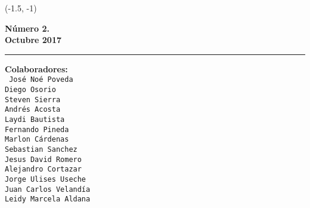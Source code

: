 \begin{textblock}{30}(-1.5, -1)
\begin{minipage}{0.12\linewidth}
\sf\color{barcolor}
\begin{center}

\vspace{1cm}

\colorbox{black}{
{\resizebox{3cm}{0.7cm}{\textcolor{white}{\bf\sf\large GLUD}}}
}
{\resizebox{2.5cm}{0.4cm}{\textcolor{white}{\bf\sf\large Magazine}}}
\vspace{4mm}

{\bf Número 2.\\ Octubre 2017}

\vspace{2cm}
\hrule

\vspace{7mm}

{\bf Colaboradores:}\\
\vspace{1mm}
{\tt
José Noé Poveda\\Diego Osorio\\
Steven Sierra\\
Andrés Acosta\\
Laydi Bautista\\
Fernando Pineda\\
Marlon Cárdenas\\
Sebastian Sanchez\\
Jesus David Romero\\
Alejandro Cortazar\\
Jorge Ulises Useche\\
Juan Carlos Velandía\\
Leidy Marcela Aldana}

\vspace{15.0mm}




\vspace{2mm}


\end{center}
\end{minipage}
\end{textblock}
